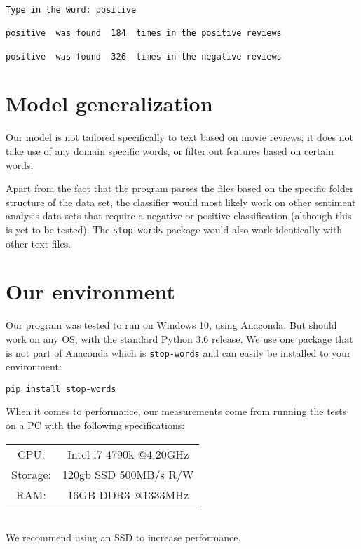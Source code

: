 \documentclass[a4paper,12pt]{article}
\begin{document}
\begin{verbatim}
Type in the word: positive

positive  was found  184  times in the positive reviews

positive  was found  326  times in the negative reviews
\end{verbatim}

\section{Model generalization}

Our model is not tailored specifically to text based on movie reviews; it does not take use of any domain specific words, or filter out features based on certain words.

Apart from the fact that the program parses the files based on the specific folder structure of the data set, the classifier would most likely work on other sentiment analysis data sets that require a negative or positive classification (although this is yet to be tested). The \texttt{stop-words} package would also work identically with other text files.

\section{Our environment}
Our program was tested to run on Windows 10, using Anaconda. But should work on any OS, with the standard Python 3.6 release. We use one package that is not part of Anaconda which is \texttt{stop-words} and can easily be installed to your environment:
\begin{verbatim}
pip install stop-words
\end{verbatim}

When it comes to performance, our measurements come from running the tests on a PC with the following specifications:
\begin{table}[h!]
\begin{center}
\begin{tabular}{ c c }
 CPU: & Intel i7 4790k @4.20GHz \\
 Storage: & 120gb SSD  500MB/s R/W \\  
 RAM: & 16GB DDR3 @1333MHz 
\end{tabular}
\end{center}
\end{table}
\\
We recommend using an SSD to increase performance.
\end{document}
